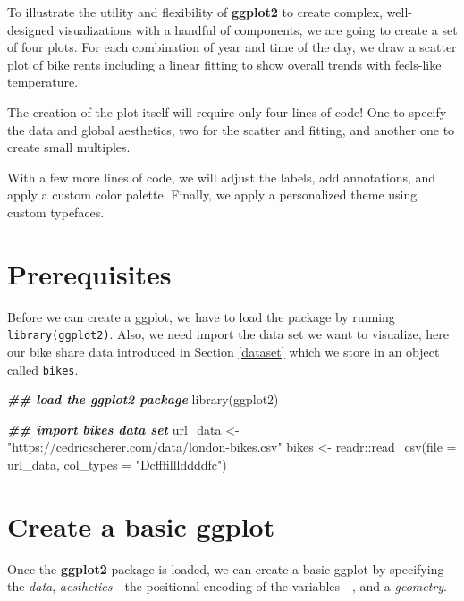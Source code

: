 \documentclass[
]{krantz}
\makeatletter
\newenvironment{Shaded}{\begin{snugshade}}{\end{snugshade}}
\newcommand{\AttributeTok}[1]{\textcolor[rgb]{0.61,0.61,0.61}{#1}}
\newcommand{\DocumentationTok}[1]{\textcolor[rgb]{0.37,0.37,0.37}{\textbf{\textit{#1}}}}
\newcommand{\FunctionTok}[1]{\textcolor[rgb]{0,0,0}{#1}}
\newcommand{\NormalTok}[1]{#1}
\newcommand{\OtherTok}[1]{\textcolor[rgb]{0.37,0.37,0.37}{#1}}
\newcommand{\SpecialCharTok}[1]{\textcolor[rgb]{0,0,0}{#1}}
\newcommand{\StringTok}[1]{\textcolor[rgb]{0.5,0.5,0.5}{#1}}
\newenvironment{kframe}{%
\medskip{}
\setlength{\fboxsep}{.8em}
 \def\at@end@of@kframe{}%
 \ifinner\ifhmode%
  \def\at@end@of@kframe{\end{minipage}}%
  \begin{minipage}{\columnwidth}%
 \fi\fi%
 \def\FrameCommand##1{\hskip\@totalleftmargin \hskip-\fboxsep
 \colorbox{shadecolor}{##1}\hskip-\fboxsep
     \hskip-\linewidth \hskip-\@totalleftmargin \hskip\columnwidth}%
 \MakeFramed {\advance\hsize-\width
   \@totalleftmargin\z@ \linewidth\hsize
   \@setminipage}}%
 {\par\unskip\endMakeFramed%
 \at@end@of@kframe}
\renewenvironment{Shaded}{\begin{kframe}}{\end{kframe}}
\makeatother
\begin{document}
To illustrate the utility and flexibility of \textbf{ggplot2} to create complex, well-designed visualizations with a handful of components, we are going to create a set of four plots. For each combination of year and time of the day, we draw a scatter plot of bike rents including a linear fitting to show overall trends with feels-like temperature.

The creation of the plot itself will require only four lines of code! One to specify the data and global aesthetics, two for the scatter and fitting, and another one to create small multiples.

With a few more lines of code, we will adjust the labels, add annotations, and apply a custom color palette. Finally, we apply a personalized theme using custom typefaces.

\hypertarget{prep-ggplot}{%
\section{Prerequisites}\label{prep-ggplot}}

Before we can create a ggplot, we have to load the package by running \texttt{library(ggplot2)}. Also, we need import the data set we want to visualize, here our bike share data introduced in Section \ref{dataset} which we store in an object called \texttt{bikes}.

\begin{Shaded}
\begin{Highlighting}[]
\DocumentationTok{\#\# load the ggplot2 package}
\FunctionTok{library}\NormalTok{(ggplot2)}

\DocumentationTok{\#\# import bikes data set}
\NormalTok{url\_data }\OtherTok{\textless{}{-}} \StringTok{"https://cedricscherer.com/data/london{-}bikes.csv"}
\NormalTok{bikes }\OtherTok{\textless{}{-}}\NormalTok{ readr}\SpecialCharTok{::}\FunctionTok{read\_csv}\NormalTok{(}\AttributeTok{file =}\NormalTok{ url\_data, }\AttributeTok{col\_types =} \StringTok{"Dcfffilllddddfc"}\NormalTok{)}
\end{Highlighting}
\end{Shaded}

\hypertarget{basics}{%
\section{Create a basic ggplot}\label{basics}}

Once the \textbf{ggplot2} package is loaded, we can create a basic ggplot by specifying the \emph{data}, \emph{aesthetics}---the positional encoding of the variables---, and a \emph{geometry}.
\end{document}
